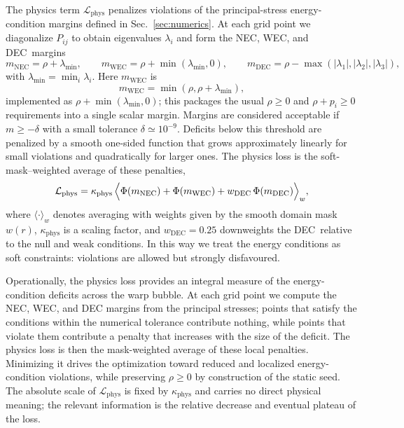 \documentclass[11pt]{article}
\makeatletter
\newcommand{\@abbr}[1]{\ifmmode\mathrm{#1}\else\textsc{#1}\fi}
\newcommand{\WEC}{\@abbr{WEC}}
\newcommand{\NEC}{\@abbr{NEC}}
\newcommand{\DEC}{\@abbr{DEC}}
\makeatother
\begin{document}
The physics term $\mathcal{L}_\text{phys}$ penalizes violations of the principal-stress energy-condition margins defined in Sec.~\ref{sec:numerics}. At each grid point we diagonalize $P_{ij}$ to obtain eigenvalues $\lambda_i$ and form the \NEC, \WEC, and \DEC\ margins
\begin{equation}
m_\text{NEC} = \rho + \lambda_{\min},\qquad
m_\text{WEC} = \rho + \min(\lambda_{\min},0),\qquad
m_\text{DEC} = \rho - \max(|\lambda_1|,|\lambda_2|,|\lambda_3|),
\end{equation}
with $\lambda_{\min}=\min_i\lambda_i$. Here $m_\text{WEC}$ is
\[
m_\text{WEC} = \min(\rho,\rho+\lambda_{\min}),
\]
implemented as $\rho + \min(\lambda_{\min},0)$; this packages the usual $\rho\ge0$ and $\rho+p_i\ge0$ requirements into a single scalar margin. Margins are considered acceptable if $m\ge -\delta$ with a small tolerance $\delta\simeq10^{-9}$. Deficits below this threshold are penalized by a smooth one-sided function that grows approximately linearly for small violations and quadratically for larger ones. The physics loss is the soft-mask–weighted average of these penalties,
\begin{equation}
\mathcal{L}_\text{phys} = \kappa_\text{phys}\,\Bigl\langle
\Phi(m_\text{NEC}) + \Phi(m_\text{WEC}) + w_\text{DEC}\,\Phi(m_\text{DEC})
\Bigr\rangle_w,
\end{equation}
where $\langle\cdot\rangle_w$ denotes averaging with weights given by the smooth domain mask $w(r)$, $\kappa_\text{phys}$ is a scaling factor, and $w_\text{DEC}=0.25$ downweights the \DEC\ relative to the null and weak conditions. In this way we treat the energy conditions as soft constraints: violations are allowed but strongly disfavoured.

Operationally, the physics loss provides an integral measure of the energy-condition deficits across the warp bubble. At each grid point we compute the NEC, WEC, and DEC margins from the principal stresses; points that satisfy the conditions within the numerical tolerance contribute nothing, while points that violate them contribute a penalty that increases with the size of the deficit. The physics loss is then the mask-weighted average of these local penalties. Minimizing it drives the optimization toward reduced and localized energy-condition violations, while preserving $\rho\ge 0$ by construction of the static seed. The absolute scale of $\mathcal{L}_\text{phys}$ is fixed by $\kappa_\text{phys}$ and carries no direct physical meaning; the relevant information is the relative decrease and eventual plateau of the loss.
\end{document}
